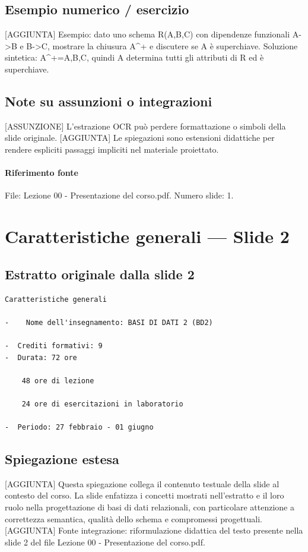 \documentclass[11pt]{article}
\begin{document}
\subsection*{Esempio numerico / esercizio}
[AGGIUNTA] Esempio: dato uno schema R(A,B,C) con dipendenze funzionali A->B e B->C, mostrare la chiusura A^+ e discutere se A è superchiave. Soluzione sintetica: A^+={A,B,C}, quindi A determina tutti gli attributi di R ed è superchiave.
\subsection*{Note su assunzioni o integrazioni}
[ASSUNZIONE] L'estrazione OCR può perdere formattazione o simboli della slide originale.
[AGGIUNTA] Le spiegazioni sono estensioni didattiche per rendere espliciti passaggi impliciti nel materiale proiettato.
\paragraph{Riferimento fonte} File: Lezione 00 - Presentazione del corso.pdf. Numero slide: 1.
\section{Caratteristiche generali --- Slide 2}
\subsection*{Estratto originale dalla slide 2}
\begin{lstlisting}
Caratteristiche generali

-    Nome dell'insegnamento: BASI DI DATI 2 (BD2)

-  Crediti formativi: 9
-  Durata: 72 ore

    48 ore di lezione

    24 ore di esercitazioni in laboratorio

-  Periodo: 27 febbraio - 01 giugno
\end{lstlisting}
\subsection*{Spiegazione estesa}
[AGGIUNTA] Questa spiegazione collega il contenuto testuale della slide al contesto del corso. La slide enfatizza i concetti mostrati nell'estratto e il loro ruolo nella progettazione di basi di dati relazionali, con particolare attenzione a correttezza semantica, qualità dello schema e compromessi progettuali.
[AGGIUNTA] Fonte integrazione: riformulazione didattica del testo presente nella slide 2 del file Lezione 00 - Presentazione del corso.pdf.
\end{document}
